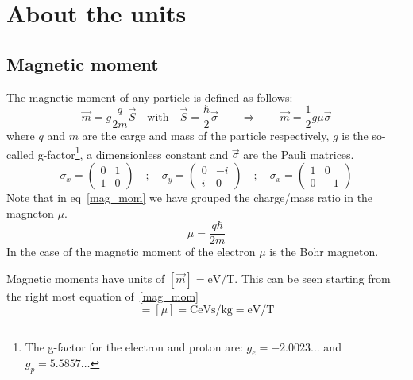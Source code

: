 \chapter{About the units}
\label{ch:units}
\section{Magnetic moment}
The magnetic moment of any particle is defined as follows:
\begin{equation}
  \vec{m} = g\frac{q}{2m}\vec{S} \quad\text{with}\quad
  \vec{S}=\frac{\hbar}{2}\vec{\sigma}\qquad\Rightarrow\qquad
  \vec{m} = \frac{1}{2}g\mu\vec{\sigma}
\label{mag_mom}
\end{equation}
where $q$ and $m$ are the carge and mass of the particle respectively, $g$ is the so-called g-factor\footnote{The g-factor for the electron and proton are: $g_e=-2.0023\dots$ and $g_p=5.5857\dots$}, a dimensionless constant and $\vec{\sigma}$ are the Pauli matrices.
\begin{equation}
  \sigma_x=\left(\begin{array}{cc}
    0 & 1 \\
    1 & 0
    \end{array}\right)\quad;\quad
  \sigma_y=\left(\begin{array}{cc}
    0 & -i \\
    i & 0
    \end{array}\right)\quad;\quad
  \sigma_x=\left(\begin{array}{cc}
    1 & 0 \\
    0 & -1
    \end{array}\right)
\label{pauli}
\end{equation}
Note that in eq~\eqref{mag_mom} we have grouped the charge/mass ratio in the magneton $\mu$.
\begin{equation}
  \mu = \frac{q\hbar}{2m}
\end{equation}
In the case of the magnetic moment of the electron $\mu$ is the Bohr magneton.

Magnetic moments have units of $[\vec{m}]=\si{\eV/\tesla}$. This can be seen starting from the right most equation of~\eqref{mag_mom}
\begin{equation*}
  [\vec{m}] = [\mu] = \si{\coulomb\eV\s\per\kilogram} = \si{\eV\per\tesla}
\end{equation*}


